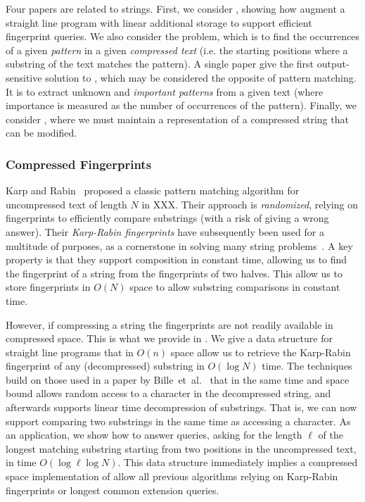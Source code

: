 Four papers are related to strings. 
First, we consider , showing how augment a straight line program with linear additional storage to support efficient fingerprint queries.
We also consider the  problem, which is to find the occurrences of a given \emph{pattern} in a given \emph{compressed text} (i.e. the starting positions where a substring of the text matches the pattern). A single paper give the first output-sensitive solution to , which may be considered the opposite of pattern matching. It is to extract unknown and \emph{important patterns} from a given text (where importance is measured as the number of occurrences of the pattern). 
Finally, we consider , where we must maintain a representation of a compressed string that can be modified.

\subsubsection{Compressed Fingerprints}
Karp and Rabin~ proposed a classic pattern matching algorithm for uncompressed text of length $N$ in XXX. Their approach is \emph{randomized}, relying on fingerprints to efficiently compare substrings (with a risk of giving a wrong answer). Their \emph{Karp-Rabin fingerprints} have subsequently been used for a multitude of purposes, as a cornerstone in solving many string problems~. A key property is that they support composition in constant time, allowing us to find the fingerprint of a string from the fingerprints of two halves. This allow us to store fingerprints in $O(N)$ space to allow substring comparisons in constant time.

However, if compressing a string the fingerprints are not readily available in compressed space. This is what we provide in . We give a data structure for straight line programs that in $O(n)$ space allow us to retrieve the Karp-Rabin fingerprint of any (decompressed) substring in $O(\log N)$ time. The techniques build on those used in a paper by Bille~et~al.~ that in the same time and space bound allows random access to a character in the decompressed string, and afterwards supports linear time decompression of substrings. That is, we can now support comparing two substrings in the same time as accessing a character. As an application, we show how to answer  queries, asking for the length $\ell$ of the longest matching substring starting from two positions in the uncompressed text, in time $O(\log \ell \log N)$.
This data structure immediately implies a compressed space implementation of allow all previous algorithms relying on Karp-Rabin fingerprints or longest common extension queries.


